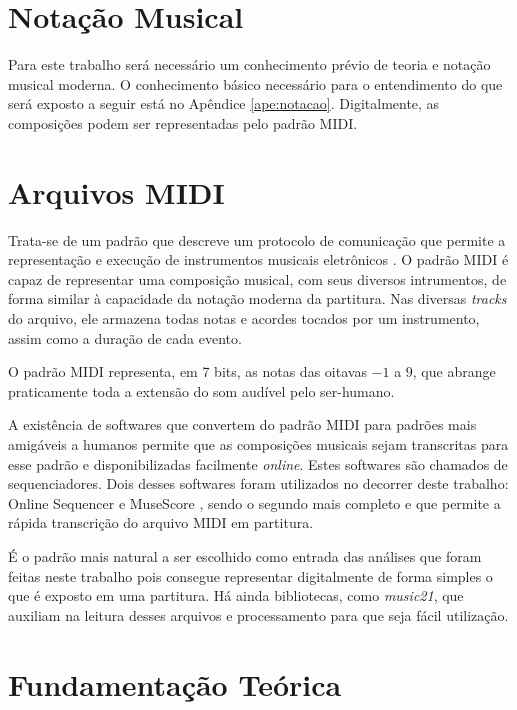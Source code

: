 \label{cap:metodo}
\section{Notação Musical}

Para este trabalho será necessário um conhecimento prévio de teoria e notação musical moderna. O conhecimento básico necessário para o entendimento do que será exposto a seguir está no Apêndice \ref{ape:notacao}.
Digitalmente, as composições podem ser representadas pelo padrão MIDI.

\section{Arquivos MIDI}

Trata-se de um padrão que descreve um protocolo de comunicação que permite a representação e execução de instrumentos musicais eletrônicos \cite{midi}. O padrão MIDI é capaz de representar uma composição musical, com seus diversos intrumentos, de forma similar à capacidade da notação moderna da partitura. Nas diversas \textit{tracks} do arquivo, ele armazena todas notas e acordes tocados por um instrumento, assim como a duração de cada evento.

O padrão MIDI representa, em 7 bits, as notas das oitavas $-1$ a $9$, que abrange praticamente toda a extensão do som audível pelo ser-humano.

A existência de softwares que convertem do padrão MIDI para padrões mais amigáveis a humanos permite que as composições musicais sejam transcritas para esse padrão e disponibilizadas facilmente \textit{online}. Estes softwares são chamados de sequenciadores. Dois desses softwares foram utilizados no decorrer deste trabalho: Online Sequencer \cite{sequencer} e MuseScore \cite{musescore}, sendo o segundo mais completo e que permite a rápida transcrição do arquivo MIDI em partitura.

É o padrão mais natural a ser escolhido como entrada das análises que foram feitas neste trabalho pois consegue representar digitalmente de forma simples o que é exposto em uma partitura. Há ainda bibliotecas, como \textit{music21}, que auxiliam na leitura desses arquivos e processamento para que seja fácil utilização.

\section{Fundamentação Teórica}
